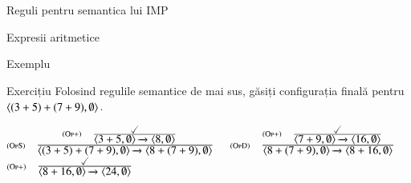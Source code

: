 \documentclass[xcolor=pdftex,romanian,colorlinks]{beamer}
\begin{document}
\begin{section}{Reguli pentru semantica lui IMP}
\begin{frame}{Expresii aritmetice}
\begin{itemize}
%
\end{itemize}
\end{frame}
\begin{frame}{Exemplu}
\begin{block}{Exercițiu}
Folosind regulile semantice de mai sus, găsiți configurația finală pentru ${\langle{(3 +5)+(7+9),\emptyset}\rangle}$.
\end{block}
\begin{itemize}
\vitem[] $\reg[OpS]{\Ss{\c{(3 +5)+(7+9),\emptyset}}{\c{8 + (7 +9),\emptyset}}}{\reg[Op+]{\Ss{\c{3 + 5,\emptyset}}{\c{8,\emptyset}}}{\done}{}}{}$
\vitem[] $\reg[OpD]{\Ss{\c{8+(7+9),\emptyset}}{\c{8 + 16,\emptyset}}}{\reg[Op+]{\Ss{\c{7 + 9,\emptyset}}{\c{16,\emptyset}}}{\done}{}}{}$
\vitem[] $\reg[Op+]{\Ss{\c{8 + 16,\emptyset}}{\c{24,\emptyset}}}{\done}{}$
\end{itemize}
\end{frame}

\end{section}
\end{document}
